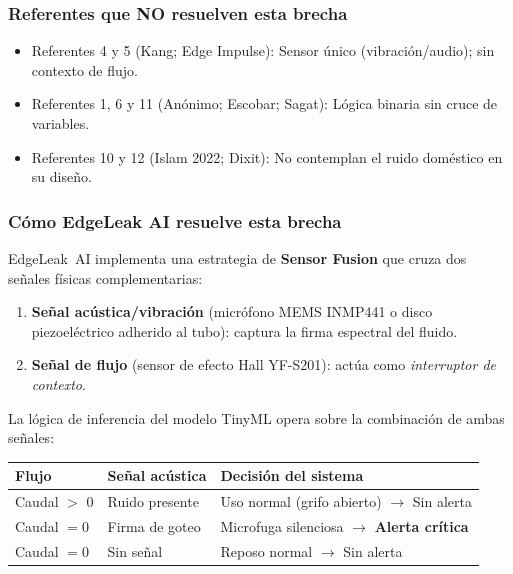 \documentclass[12pt,a4paper]{article}
\begin{document}
\subsubsection{Referentes que NO resuelven esta brecha}

\begin{itemize}[nosep]
  \item Referentes 4 y 5 (Kang; Edge Impulse): Sensor único (vibración/audio); sin contexto de flujo.
  \item Referentes 1, 6 y 11 (Anónimo; Escobar; Sagat): Lógica binaria sin cruce de variables.
  \item Referentes 10 y 12 (Islam 2022; Dixit): No contemplan el ruido doméstico en su diseño.
\end{itemize}

\subsubsection{Cómo EdgeLeak AI resuelve esta brecha}

EdgeLeak~AI implementa una estrategia de \textbf{Sensor Fusion} que cruza dos señales
físicas complementarias:

\begin{enumerate}[nosep]
  \item \textbf{Señal acústica/vibración} (micrófono MEMS INMP441 o disco piezoeléctrico
    adherido al tubo): captura la firma espectral del fluido.
  \item \textbf{Señal de flujo} (sensor de efecto Hall YF-S201): actúa como
    \emph{interruptor de contexto}.
\end{enumerate}

\noindent La lógica de inferencia del modelo TinyML opera sobre la combinación de ambas
señales:

\begin{center}
\begin{tabular}{ll l}
\toprule
\textbf{Flujo} & \textbf{Señal acústica} & \textbf{Decisión del sistema} \\
\midrule
Caudal $>$ 0 & Ruido presente & Uso normal (grifo abierto) $\rightarrow$ Sin alerta \\
Caudal $= 0$ & Firma de goteo & Microfuga silenciosa $\rightarrow$ \textbf{Alerta crítica} \\
Caudal $= 0$ & Sin señal & Reposo normal $\rightarrow$ Sin alerta \\
\bottomrule
\end{tabular}
\end{center}
\end{document}
